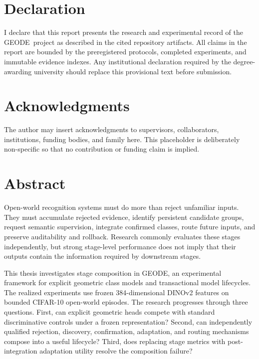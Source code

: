 \documentclass[12pt,oneside]{report}
\newcommand{\systemname}{GEODE}
\begin{document}
\chapter*{Declaration}

I declare that this report presents the research and experimental record of the
\systemname\ project as described in the cited repository artifacts. All
claims in the report are bounded by the preregistered protocols, completed
experiments, and immutable evidence indexes. Any institutional declaration
required by the degree-awarding university should replace this provisional
text before submission.

\chapter*{Acknowledgments}

The author may insert acknowledgments to supervisors, collaborators,
institutions, funding bodies, and family here. This placeholder is deliberately
non-specific so that no contribution or funding claim is implied.

\chapter*{Abstract}

Open-world recognition systems must do more than reject unfamiliar inputs.
They must accumulate rejected evidence, identify persistent candidate groups,
request semantic supervision, integrate confirmed classes, route future
inputs, and preserve auditability and rollback. Research commonly evaluates
these stages independently, but strong stage-level performance does not imply
that their outputs contain the information required by downstream stages.

This thesis investigates stage composition in \systemname, an experimental
framework for explicit geometric class models and transactional model
lifecycles. The realized experiments use frozen 384-dimensional DINOv2
features on bounded CIFAR-10 open-world episodes. The research progresses
through three questions. First, can explicit geometric heads compete with
standard discriminative controls under a frozen representation? Second, can
independently qualified rejection, discovery, confirmation, adaptation, and
routing mechanisms compose into a useful lifecycle? Third, does replacing
stage metrics with post-integration adaptation utility resolve the composition
failure?
\end{document}
